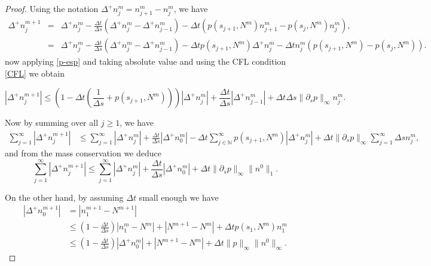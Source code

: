 \documentclass[11pt,a4paper]{article}
\newcommand{\N}{\mathbb{N}}
\begin{document}
\begin{proof}
Using the notation $\Delta^{+}n_j^m=n_{j+1}^{m}-n_{j}^{m}$, we have
\begin{eqnarray*}
   \Delta^{+}n_j^{m+1}&=& \Delta^{+}n_j^{m}-\frac{\Delta t}{\Delta s}\left(\Delta^{+}n_j^{m}-\Delta^{+}n_{j-1}^{m}\right)-\Delta t \left(p(s_{j+1},N^m)n_{j+1}^m-p(s_{j},N^m)n_j^m\right),\\
   &=& \Delta^{+}n_j^{m}-\frac{\Delta t}{\Delta s}\left(\Delta^{+}n_j^{m}-\Delta^{+}n_{j-1}^{m}\right)-\Delta t p(s_{j+1},N^m)\Delta^{+}n_j^{m} -\Delta t n_j^m(p(s_{j+1},N^m)-p(s_{j},N^m)).
\end{eqnarray*}
now applying  \eqref{p-esp} and taking absolute value and using the CFL condition \eqref{CFL} we obtain

\begin{equation*}
     |\Delta^{+}n_j^{m+1}| \le \left(1-\Delta t\left( \frac{1}{\Delta s}+p(s_{j+1},N^m) \right) \right)|\Delta^{+}n_j^{m}|
     +\frac{\Delta t}{\Delta s}|\Delta^{+}n_{j-1}^{m}|+\Delta t\Delta s\|\partial_s p\|_\infty n_j^m.
\end{equation*}

Now by summing over all $j\ge1$, we have 
\begin{equation*}
    \begin{split}
       \sum_{j=1}^\infty|\Delta^{+}n_j^{m+1}|&\le \sum_{j=1}^\infty|\Delta^{+}n_j^{m}|+\frac{\Delta t}{\Delta s}|\Delta^{+}n_{0}^{m}|
-\Delta t \sum_{j\in\N}^\infty p(s_{j+1},N^m) |\Delta^{+}n_j^{m}| +\Delta t\|\partial_s p\|_\infty\sum_{j=1}^{\infty}\Delta s n_j^m,
    \end{split}
\end{equation*}
and from the mass conservation we deduce
\begin{equation}
\label{cota2}
\sum_{j=1}^\infty|\Delta^{+}n_j^{m+1}|\le
\sum_{j=1}^\infty|\Delta^{+}n_j^{m}|
+ \frac{\Delta t}{\Delta s} |\Delta^{+}n_{0}^{m}|+\Delta t\|\partial_s p\|_\infty\|n^0\|_1. 
\end{equation}

On the other hand, by assuming $\Delta t$ small enough we have
\begin{equation}
\label{cota3}
\begin{split}
     |\Delta^{+}n_0^{m+1}| & = |n_1^{m+1}-N^{m+1}|\\
     & \le \left(1-\frac{\Delta t}{\Delta s}\right)|n_1^m-N^m|+  |N^{m+1}- N^m|+\Delta t p(s_1,N^m) n^m_1\\
     &\le \left(1-\frac{\Delta t}{\Delta s}\right)|\Delta^+ n_0^m|+  |N^{m+1}- N^m|+\Delta t \|p\|_\infty \|n^0\|_\infty.
\end{split} 
\end{equation}


\end{proof}
\end{document}

